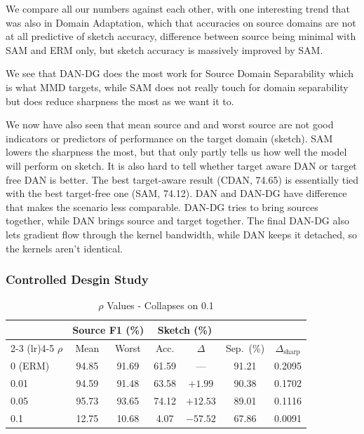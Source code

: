 \documentclass{article}
\begin{document}
We compare all our numbers against each other, with one interesting trend that was also in Domain Adaptation, which that accuracies on source domains
are not at all predictive of  sketch accuracy, difference between source being minimal with SAM and ERM only, but sketch accuracy is massively improved by SAM.

We see that DAN-DG does the most work for Source Domain Separability which is what MMD targets, while SAM does not really touch for domain separability but does reduce sharpness the most as we want it to.



We now have also seen that mean source and and worst source are not good indicators or predictors of performance on the target domain (sketch). SAM lowers the sharpness the most, but that only
partly tells us how well the model will perform on sketch. It is also hard to tell whether target aware DAN or target free DAN is better.
The best target-aware result (CDAN, 74.65) is essentially tied with the best target-free one (SAM, 74.12). DAN and DAN-DG have difference that makes the scenario less comparable. DAN-DG tries to bring
sources together, while DAN brings source and target together. The final DAN-DG also lets gradient flow through the kernel bandwidth, while DAN keeps it detached, so the kernels aren't identical.


\subsubsection{Controlled Desgin Study}



\begin{table}[tb]
  \caption{$\rho$ Values - Collapses on 0.1}
  \label{tab:sam-study}
  \centering
  \footnotesize
  \begin{tabular}{lcccccc}
    \toprule
    & \multicolumn{2}{c}{Source F1 (\%)} & \multicolumn{2}{c}{Sketch (\%)} & & \\
    \cmidrule(lr){2-3} \cmidrule(lr){4-5}
    $\rho$ & Mean & Worst & Acc. & $\Delta$ & Sep.\ (\%) & $\Delta_{\mathrm{sharp}}$ \\
    \midrule
    0 (ERM) & 94.85 & 91.69 & 61.59 & ---      & 91.21 & 0.2095 \\
    0.01    & 94.59 & 91.48 & 63.58 & $+1.99$  & 90.38 & 0.1702 \\
    0.05    & 95.73 & 93.65 & 74.12 & $+12.53$ & 89.01 & 0.1116 \\
    0.1     & 12.75 & 10.68 &  4.07 & $-57.52$ & 67.86 & 0.0091 \\
    \bottomrule
  \end{tabular}
\end{table}
\end{document}
